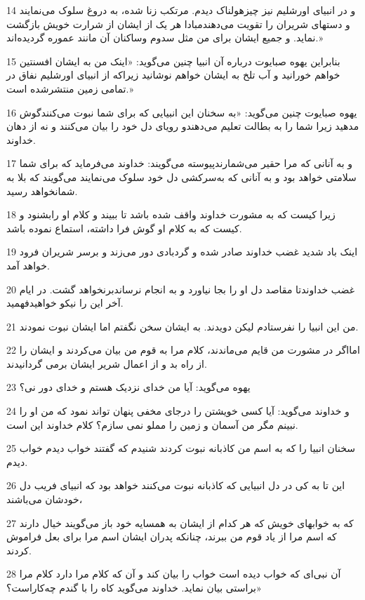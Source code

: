 \par 14 و در انبیای اورشلیم نیز چیزهولناک دیدم. مرتکب زنا شده، به دروغ سلوک می‌نمایند و دستهای شریران را تقویت می‌دهندمبادا هر یک از ایشان از شرارت خویش بازگشت نماید. و جمیع ایشان برای من مثل سدوم وساکنان آن مانند عموره گردیده‌اند.»
\par 15 بنابراین یهوه صبایوت درباره آن انبیا چنین می‌گوید: «اینک من به ایشان افسنتین خواهم خورانید و آب تلخ به ایشان خواهم نوشانید زیراکه از انبیای اورشلیم نفاق در تمامی زمین منتشرشده است.»
\par 16 یهوه صبایوت چنین می‌گوید: «به سخنان این انبیایی که برای شما نبوت می‌کنندگوش مدهید زیرا شما را به بطالت تعلیم می‌دهندو رویای دل خود را بیان می‌کنند و نه از دهان خداوند.
\par 17 و به آنانی که مرا حقیر می‌شمارندپیوسته می‌گویند: خداوند می‌فرماید که برای شما سلامتی خواهد بود و به آنانی که به‌سرکشی دل خود سلوک می‌نمایند می‌گویند که بلا به شمانخواهد رسید.
\par 18 زیرا کیست که به مشورت خداوند واقف شده باشد تا ببیند و کلام او رابشنود و کیست که به کلام او گوش فرا داشته، استماع نموده باشد.
\par 19 اینک باد شدید غضب خداوند صادر شده و گردبادی دور می‌زند و برسر شریران فرود خواهد آمد.
\par 20 غضب خداوندتا مقاصد دل او را بجا نیاورد و به انجام نرساندبرنخواهد گشت. در ایام آخر این را نیکو خواهیدفهمید.
\par 21 من این انبیا را نفرستادم لیکن دویدند. به ایشان سخن نگفتم اما ایشان نبوت نمودند.
\par 22 امااگر در مشورت من قایم می‌ماندند، کلام مرا به قوم من بیان می‌کردند و ایشان را از راه بد و از اعمال شریر ایشان برمی گردانیدند.
\par 23 یهوه می‌گوید: آیا من خدای نزدیک هستم و خدای دور نی؟
\par 24 و خداوند می‌گوید: آیا کسی خویشتن را درجای مخفی پنهان تواند نمود که من او را نبینم مگر من آسمان و زمین را مملو نمی سازم؟ کلام خداوند این است.
\par 25 سخنان انبیا را که به اسم من کاذبانه نبوت کردند شنیدم که گفتند خواب دیدم خواب دیدم.
\par 26 این تا به کی در دل انبیایی که کاذبانه نبوت می‌کنند خواهد بود که انبیای فریب دل خودشان می‌باشند،
\par 27 که به خوابهای خویش که هر کدام از ایشان به همسایه خود باز می‌گویند خیال دارند که اسم مرا از یاد قوم من ببرند، چنانکه پدران ایشان اسم مرا برای بعل فراموش کردند.
\par 28 آن نبی‌ای که خواب دیده است خواب را بیان کند و آن که کلام مرا دارد کلام مرا براستی بیان نماید. خداوند می‌گوید کاه را با گندم چه‌کاراست؟»
